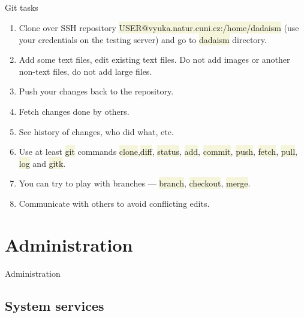 \documentclass[compress, ucs, xelatex, 11pt, xcolor=svgnames, aspectratio=169,
	hyperref={
		bookmarks=true,
		unicode=true,
		colorlinks=true,
		pdftitle={Linux, command line and MetaCentrum},
		plainpages=false,
		pdfauthor={Vojtech Zeisek},
		pdfsubject={Course about use of Linux command line, writing shell scripts and using MetaCentrum of CESNET},
		pdfcreator={XeLaTeX},
		pdfkeywords={Linux, GNU, BASH, shell, command line, MetaCentrum},
		linkcolor=DarkRed, %
		anchorcolor=DarkBlue, %
		citecolor=Indigo, %
		filecolor=NavyBlue, %
		menucolor=DarkMagenta, %
		urlcolor=DarkBlue, %
		pdftex},
	url={hyphens, lowtilde} %
	]{beamer}
\renewcommand{\texttt}[1]{\colorbox{Beige}{{\ttfamily #1}}}
\begin{document}
\subsection{}

\begin{frame}{Git tasks}
	\begin{enumerate}
		\item Clone over SSH repository \texttt{USER@vyuka.natur.cuni.cz:/home/dadaism} (use your credentials on the testing server) and go to \texttt{dadaism} directory.
		\item Add some text files, edit existing text files. Do not add images or another non-text files, do not add large files.
		\item Push your changes back to the repository.
		\item Fetch changes done by others.
		\item See history of changes, who did what, etc.
		\item Use at least \texttt{git} commands \texttt{clone},\texttt{diff}, \texttt{status}, \texttt{add}, \texttt{commit}, \texttt{push}, \texttt{fetch}, \texttt{pull}, \texttt{log} and \texttt{gitk}.
		\item You can try to play with branches --- \texttt{branch}, \texttt{checkout}, \texttt{merge}.
		\item Communicate with others to avoid conflicting edits.
	\end{enumerate}
\end{frame}

\section{Administration}

\begin{frame}{Administration}
	\tableofcontents[currentsection, sectionstyle=show/hide, hideothersubsections]
\end{frame}

\subsection{System services}
\end{document}
